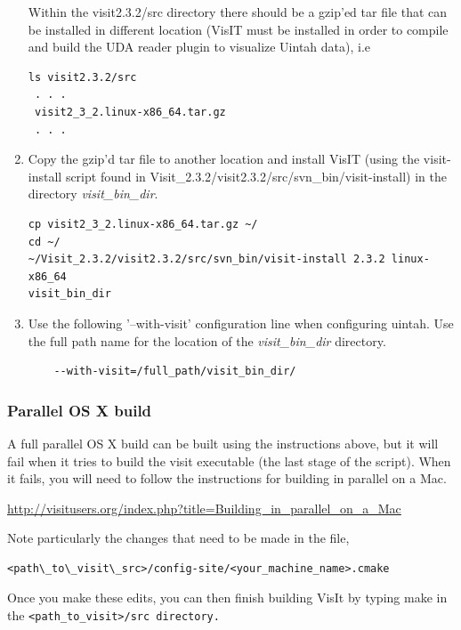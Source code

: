 \documentclass[12pt]{article}
\begin{document}
\begin{enumerate}
Within the visit2.3.2/src directory there should be a gzip'ed tar
file that can be installed in different location (VisIT must be
installed in order to compile and build the UDA reader plugin to
visualize Uintah data), i.e

\begin{verbatim}
ls visit2.3.2/src
 . . . 
 visit2_3_2.linux-x86_64.tar.gz
 . . .
\end{verbatim}

\item Copy the gzip'd tar file to another location and install VisIT
  (using the visit-install script found in
  Visit\_2.3.2/visit2.3.2/src/svn\_bin/visit-install) in the directory
  \emph{visit\_bin\_dir}.

\begin{verbatim}
cp visit2_3_2.linux-x86_64.tar.gz ~/
cd ~/
~/Visit_2.3.2/visit2.3.2/src/svn_bin/visit-install 2.3.2 linux-x86_64
visit_bin_dir
\end{verbatim}

\item Use the following '--with-visit' configuration line when
  configuring uintah. Use the full path name for the location of the
  \emph{visit\_bin\_dir} directory.

\begin{verbatim}
    --with-visit=/full_path/visit_bin_dir/ 
\end{verbatim}

\end{enumerate}


\subsubsection{Parallel OS X build}
\label{sec:ParallelOSXBuild}

A full parallel OS X build can be built using the instructions above,
but it will fail when it tries to build the visit executable (the last
stage of the script). When it fails, you will need to follow the
instructions for building in parallel on a Mac.

\url{http://visitusers.org/index.php?title=Building_in_parallel_on_a_Mac}

  
Note particularly the changes that need to be made in the file, 

\begin{verbatim}
<path\_to\_visit\_src>/config-site/<your_machine_name>.cmake
\end{verbatim}

\normalfont Once you make these edits, you can then finish building VisIt by typing make in the \tt <path\_to\_visit>/src \normalfont directory.  
\end{document}
